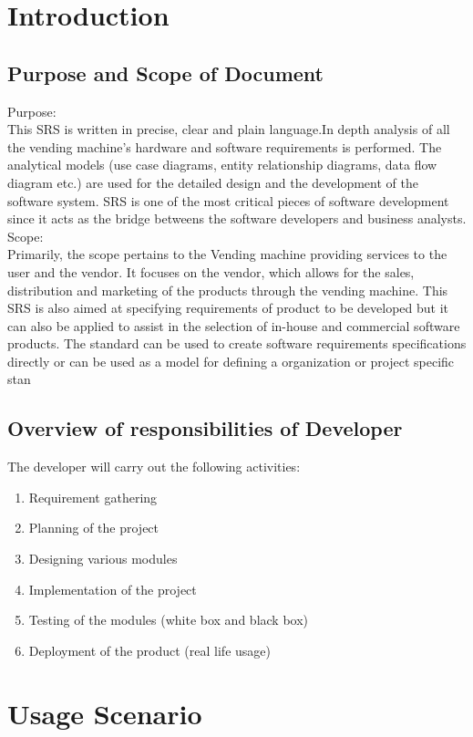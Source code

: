 \documentclass[oneside,a4paper,12pt]{report}
\begin{document}
\section{Introduction}
\subsection{Purpose and Scope of Document}
Purpose:\\
This SRS is written in precise, clear and plain language.In depth analysis of all the vending machine's hardware and software requirements is performed.
The analytical models (use case diagrams, entity relationship diagrams, data flow diagram etc.) are used for the detailed design and the development of the software system. SRS is one of
the most critical pieces of software development since it acts as the bridge betweens the
software developers and business analysts.\\
Scope:\\
Primarily, the scope pertains to the Vending machine providing services to the user and the
vendor. It focuses on the vendor, which allows for the sales, distribution and marketing of the
products through the vending machine.
This SRS is also aimed at specifying requirements of product to be developed but it can also be
applied to assist in the selection of in-house and commercial software products. The standard can
be used to create software requirements specifications directly or can be used as a model for
defining a organization or project specific stan\\
\subsection{Overview of responsibilities of Developer}
The developer will carry out the following activities:
\begin{enumerate}

\item Requirement gathering
\item Planning of the project
\item Designing various modules
\item Implementation of the project
\item Testing of the modules (white box and black box)
\item Deployment of the product (real life usage)

\end{enumerate}

\section{Usage Scenario}
\end{document}
